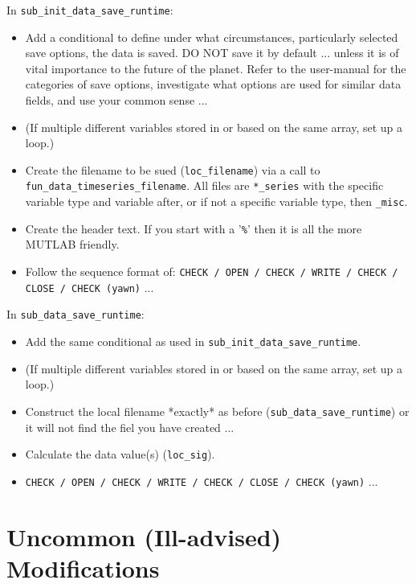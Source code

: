 \documentclass[11pt,fleqn]{book} %
\begin{document}
\noindent In \texttt{sub\_init\_data\_save\_runtime}:
\begin{itemize}[noitemsep]
\item Add a conditional to define under what circumstances, particularly selected save options, the data is saved. DO NOT save it by default ... unless it is of vital importance to the future of the planet. Refer to the user-manual for the categories of save options, investigate what options are used for similar data fields, and use your common sense ...
\item (If multiple different variables stored in or based on the same array, set up a loop.)
\item Create the filename to be sued (\texttt{loc\_filename}) via a call to \texttt{fun\_data\_timeseries\_filename}. All files are \texttt{*\_series} with the specific variable type and variable after, or if not a specific variable type, then \texttt{\_misc}.
\item Create the header text. If you start with a '\texttt{\%}' then it is all the more MUTLAB friendly.
\item Follow the sequence format of: \texttt{CHECK / OPEN / CHECK / WRITE / CHECK / CLOSE / CHECK (yawn)} ...
\end{itemize}
\noindent In  \texttt{sub\_data\_save\_runtime}:
\begin{itemize}[noitemsep]
\item Add the same conditional as used in \texttt{sub\_init\_data\_save\_runtime}. \item (If multiple different variables stored in or based on the same array, set up a loop.)
\item Construct the local filename *exactly* as before (\texttt{sub\_data\_save\_runtime}) or it will not find the fiel you have created ...
\item Calculate the data value(s) (\texttt{loc\_sig}).
\item  \texttt{CHECK / OPEN / CHECK / WRITE / CHECK / CLOSE / CHECK (yawn)} ...
\end{itemize}


\newpage

%
\section{Uncommon (Ill-advised) Modifications}
\end{document}
